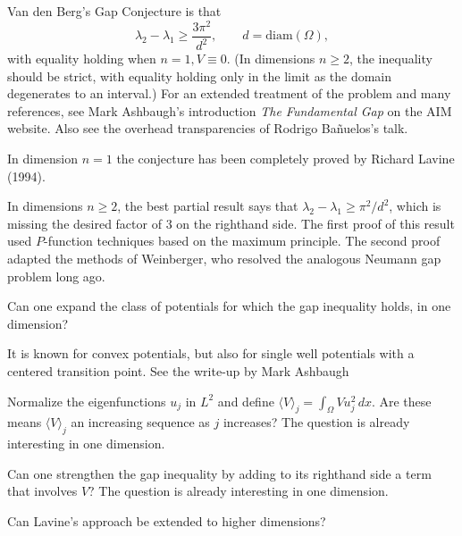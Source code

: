 \documentclass[12pt,letterpaper, reqno]{amsart}
\begin{document}
Van den Berg's Gap Conjecture is that
\[
\lambda_2 - \lambda_1 \geq \frac{3\pi^2}{d^2} , \qquad d=\text{diam}(\Omega) ,
\]
with equality holding when $n=1, V \equiv 0$. (In dimensions $n \geq
2$, the inequality should be strict, with equality holding only in
the limit as the domain degenerates to an interval.) For an extended treatment of the problem and many references, see Mark Ashbaugh's introduction \emph{The Fundamental Gap} on the AIM website. Also see the overhead transparencies of Rodrigo Ba\~{n}uelos's talk.

In dimension $n=1$ the conjecture has been completely proved by
Richard Lavine (1994).

In dimensions $n \geq 2$, the best partial result says that
$\lambda_2 - \lambda_1 \geq \pi^2/d^2$, which is missing the desired
factor of $3$ on the righthand side. The first proof of this result
used $P$-function techniques based on the maximum principle. The
second proof adapted the methods of Weinberger, who resolved the
analogous Neumann gap problem long ago.



\begin{problemblock}

\begin{problem}
Can one expand the class of
potentials for which the gap inequality holds, in one dimension? 
\end{problem}

It
is known for convex potentials, but also for single well potentials
with a centered transition point. See the write-up by Mark Ashbaugh

\end{problemblock}


\begin{problem}
Normalize the eigenfunctions
$u_j$ in $L^2$ and define $\langle V \rangle_j = \int_\Omega V u_j^2
\, dx$. Are these means  $\langle V \rangle_j$ an increasing
sequence as $j$ increases? The question is already interesting in
one dimension.
\end{problem}



\begin{problem}
Can one strengthen the gap
inequality by adding to its righthand side a term that involves $V$?
The question is already interesting in one dimension.
\end{problem}

\begin{problem}
 Can Lavine's approach be
extended to higher dimensions?
\end{problem}
\end{document}
